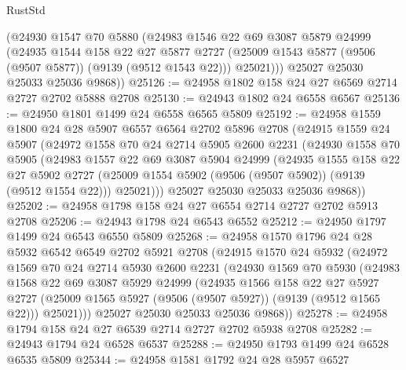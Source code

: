 \begin{lexlean}{RustStd}
\begin{coremodule}
        (@24930
          @1547
          @70
          @5880
          (@24983
            @1546
            @22
            @69
            @3087
            @5879
            @24999
            (@24935
              @1544
              @158
              @22
              @27
              @5877
              @2727
              (@25009 @1543 @5877 (@9506 (@9507 @5877)) (@9139 (@9512 @1543 @22)))
              @25021)))
        @25027
        @25030
        @25033
        @25036
        @9868))
@25126 := @24958 @1802 @158 @24 @27 @6569 @2714 @2727 @2702 @5888 @2708
@25130 := @24943 @1802 @24 @6558 @6567
@25136 := @24950 @1801 @1499 @24 @6558 @6565 @5809
@25192 := @24958
    @1559
    @1800
    @24
    @28
    @5907
    @6557
    @6564
    @2702
    @5896
    @2708
    (@24915
      @1559
      @24
      @5907
      (@24972
        @1558
        @70
        @24
        @2714
        @5905
        @2600
        @2231
        (@24930
          @1558
          @70
          @5905
          (@24983
            @1557
            @22
            @69
            @3087
            @5904
            @24999
            (@24935
              @1555
              @158
              @22
              @27
              @5902
              @2727
              (@25009 @1554 @5902 (@9506 (@9507 @5902)) (@9139 (@9512 @1554 @22)))
              @25021)))
        @25027
        @25030
        @25033
        @25036
        @9868))
@25202 := @24958 @1798 @158 @24 @27 @6554 @2714 @2727 @2702 @5913 @2708
@25206 := @24943 @1798 @24 @6543 @6552
@25212 := @24950 @1797 @1499 @24 @6543 @6550 @5809
@25268 := @24958
    @1570
    @1796
    @24
    @28
    @5932
    @6542
    @6549
    @2702
    @5921
    @2708
    (@24915
      @1570
      @24
      @5932
      (@24972
        @1569
        @70
        @24
        @2714
        @5930
        @2600
        @2231
        (@24930
          @1569
          @70
          @5930
          (@24983
            @1568
            @22
            @69
            @3087
            @5929
            @24999
            (@24935
              @1566
              @158
              @22
              @27
              @5927
              @2727
              (@25009 @1565 @5927 (@9506 (@9507 @5927)) (@9139 (@9512 @1565 @22)))
              @25021)))
        @25027
        @25030
        @25033
        @25036
        @9868))
@25278 := @24958 @1794 @158 @24 @27 @6539 @2714 @2727 @2702 @5938 @2708
@25282 := @24943 @1794 @24 @6528 @6537
@25288 := @24950 @1793 @1499 @24 @6528 @6535 @5809
@25344 := @24958
    @1581
    @1792
    @24
    @28
    @5957
    @6527

\end{coremodule}
\end{lexlean}
